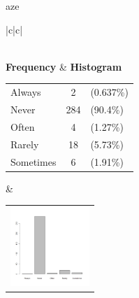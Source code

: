  aze 
  \begin{center}
    \addtolength{\leftskip}{-4cm}\addtolength{\rightskip}{-4cm}
    \begin{tabular}{|c|c|}

      \hline
        \\
      \hline
        {\bf Frequency} & {\bf Histogram}  \\
          \begin{tabular}{@{}l@{ : }cl@{}}
            Always & 2 &(0.637\%) \\
            Never & 284 &(90.4\%) \\
            Often & 4 &(1.27\%) \\
            Rarely & 18 &(5.73\%) \\
            Sometimes & 6 &(1.91\%) \\
          \end{tabular}
      &
          \begin{tabular}{@{}l@{}}
            \includegraphics[width=3cm]{graphUniv/V16-barplot}
          \end{tabular}
      \\ \hline 

    \end{tabular}
  \end{center}
  
  



